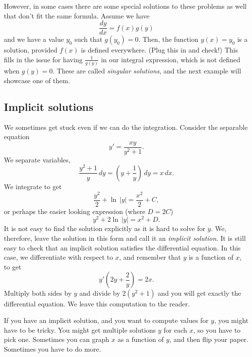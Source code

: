 \documentclass{ximera}
\begin{document}
However, in some cases there are some special solutions to these problems as well that don't fit the same formula. Assume we have
\begin{equation*}
    \frac{dy}{dx} = f(x)g(y)
\end{equation*}
and we have a value $y_0$ such that $g(y_0) = 0$. Then, the function $y(x) = y_0$ is a solution, provided $f(x)$ is defined everywhere. (Plug this in and check!) This fills in the issue for having $\frac{1}{g(y)}$ in our integral expression, which is not defined when $g(y) = 0$. These are called \emph{singular solutions}, and the next example will showcase one of them. 

\subsection{Implicit solutions}

We sometimes get stuck even if we can do the integration.  Consider the separable equation
\begin{equation*}
    y' = \frac{xy}{y^2+1} .
\end{equation*}
We separate variables,
\begin{equation*}
    \frac{y^2+1}{y}\,dy = \left(y+\frac{1}{y}\right)\,dy = x\,dx .
\end{equation*}
We integrate to get
\begin{equation*}
    \frac{y^2}{2} + \ln \, \lvert y \rvert = \frac{x^2}{2} + C ,
\end{equation*}
or perhaps the easier looking expression (where $D = 2C$)
\begin{equation*}
    y^2 + 2 \ln \, \lvert y\rvert = x^2 + D .
\end{equation*}
It is not easy to find the solution explicitly as it is hard to solve for $y$.  We, therefore, leave the solution in this form and call it an \emph{implicit solution}. It is still easy to check that an implicit solution satisfies the differential equation.  In this case, we differentiate with respect to $x$, and remember that $y$ is a function of $x$, to get
\begin{equation*}
    y'\left(2y + \frac{2}{y}\right) = 2x .
\end{equation*}
Multiply both sides by $y$ and divide by $2(y^2+1)$ and you will get exactly the differential equation.  We leave this computation to the reader.

If you have an implicit solution, and you want to compute values for $y$, you might have to be tricky.  You might get multiple solutions $y$ for each $x$, so you have to pick one.  Sometimes you can graph $x$ as a function of $y$, and then flip your paper. Sometimes you have to do more.
\end{document}
